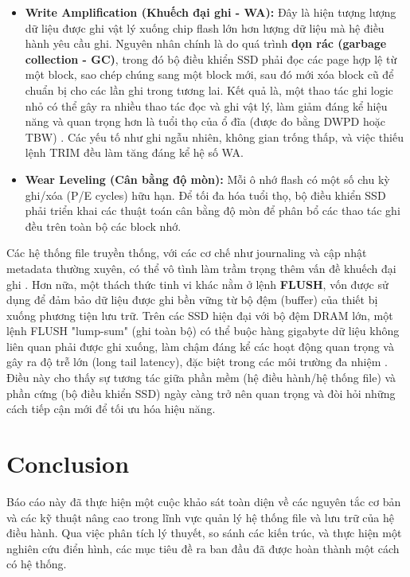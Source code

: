\documentclass[12pt]{article}
\begin{document}
\begin{itemize}
    \item \textbf{Write Amplification (Khuếch đại ghi - WA):} Đây là hiện tượng lượng dữ liệu được ghi vật lý xuống chip flash lớn hơn lượng dữ liệu mà hệ điều hành yêu cầu ghi. Nguyên nhân chính là do quá trình \textbf{dọn rác (garbage collection - GC)}, trong đó bộ điều khiển SSD phải đọc các page hợp lệ từ một block, sao chép chúng sang một block mới, sau đó mới xóa block cũ để chuẩn bị cho các lần ghi trong tương lai. Kết quả là, một thao tác ghi logic nhỏ có thể gây ra nhiều thao tác đọc và ghi vật lý, làm giảm đáng kể hiệu năng và quan trọng hơn là tuổi thọ của ổ đĩa (được đo bằng DWPD hoặc TBW) \parencite{Viking2017AN0035}. Các yếu tố như ghi ngẫu nhiên, không gian trống thấp, và việc thiếu lệnh TRIM đều làm tăng đáng kể hệ số WA.
    \item \textbf{Wear Leveling (Cân bằng độ mòn):} Mỗi ô nhớ flash có một số chu kỳ ghi/xóa (P/E cycles) hữu hạn. Để tối đa hóa tuổi thọ, bộ điều khiển SSD phải triển khai các thuật toán cân bằng độ mòn để phân bổ các thao tác ghi đều trên toàn bộ các block nhớ.
\end{itemize}

Các hệ thống file truyền thống, với các cơ chế như journaling và cập nhật metadata thường xuyên, có thể vô tình làm trầm trọng thêm vấn đề khuếch đại ghi \parencite{Lu2013Extending}. Hơn nữa, một thách thức tinh vi khác nằm ở lệnh \textbf{FLUSH}, vốn được sử dụng để đảm bảo dữ liệu được ghi bền vững từ bộ đệm (buffer) của thiết bị xuống phương tiện lưu trữ. Trên các SSD hiện đại với bộ đệm DRAM lớn, một lệnh FLUSH "lump-sum" (ghi toàn bộ) có thể buộc hàng gigabyte dữ liệu không liên quan phải được ghi xuống, làm chậm đáng kể các hoạt động quan trọng và gây ra độ trễ lớn (long tail latency), đặc biệt trong các môi trường đa nhiệm \parencite{Yeon2018RFLUSH}. Điều này cho thấy sự tương tác giữa phần mềm (hệ điều hành/hệ thống file) và phần cứng (bộ điều khiển SSD) ngày càng trở nên quan trọng và đòi hỏi những cách tiếp cận mới để tối ưu hóa hiệu năng.


\section{Conclusion}
Báo cáo này đã thực hiện một cuộc khảo sát toàn diện về các nguyên tắc cơ bản và các kỹ thuật nâng cao trong lĩnh vực quản lý hệ thống file và lưu trữ của hệ điều hành. Qua việc phân tích lý thuyết, so sánh các kiến trúc, và thực hiện một nghiên cứu điển hình, các mục tiêu đề ra ban đầu đã được hoàn thành một cách có hệ thống.
\end{document}
